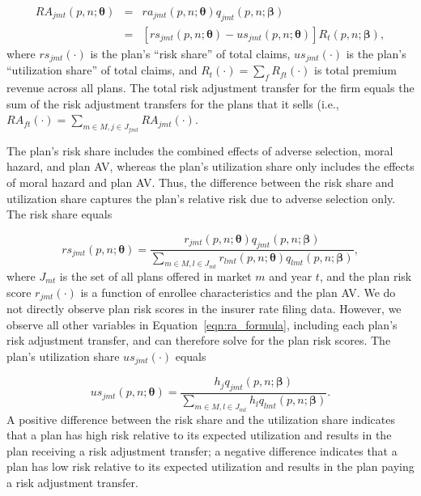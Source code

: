 \documentclass[12pt]{article}
\begin{document}
\vspace{-0.4in}
\begin{eqnarray}
\label{eqn:ra_formula}
	RA_{jmt}(\textit{p},\textit{n};\boldsymbol{\theta}) &=& ra_{jmt}(\textit{p},\textit{n};\boldsymbol{\theta})  q_{jmt}(\textit{p},\textit{n};\boldsymbol{\beta}) \nonumber \\
	&= & \left[rs_{jmt}(\textit{p},\textit{n};\boldsymbol{\theta})  - us_{jmt}(\textit{p},\textit{n};\boldsymbol{\theta})  \right] R_t(\textit{p},\textit{n};\boldsymbol{\beta}),
\end{eqnarray}
where $rs_{jmt}(\cdot)$ is the plan's ``risk share'' of total claims, $us_{jmt}(\cdot)$ is the plan's ``utilization share'' of total claims, and $R_t(\cdot) = \sum_f R_{ft}(\cdot)$ is total premium revenue across all plans. The total risk adjustment transfer for the firm equals the sum of the risk adjustment transfers for the plans that it sells (i.e., $RA_{ft}(\cdot) = \sum_{m \in M, j \in J_{fmt}} RA_{jmt}(\cdot)$.
	
The plan's risk share includes the combined effects of adverse selection, moral hazard, and plan AV, whereas the plan's utilization share only includes the effects of moral hazard and plan AV. Thus, the difference between the risk share and utilization share captures the plan's relative risk due to adverse selection only. The risk share equals

\vspace{-0.1in}
\begin{equation*}
	rs_{jmt}(\textit{p},\textit{n};\boldsymbol{\theta}) = \frac{ r_{jmt}(\textit{p},\textit{n};\boldsymbol{\theta}) q_{jmt}(\textit{p},\textit{n};\boldsymbol{\beta})}{\sum_{m \in M, l \in J_{mt}}  r_{lmt}(\textit{p},\textit{n};\boldsymbol{\theta}) q_{lmt}(\textit{p},\textit{n};\boldsymbol{\beta})},
\end{equation*}
where $J_{mt}$ is the set of all plans offered in market $m$ and year $t$, and the plan risk score $r_{jmt}(\cdot)$ is a function of enrollee characteristics and the plan AV. We do not directly observe plan risk scores in the insurer rate filing data.  However, we observe all other variables in Equation~\eqref{eqn:ra_formula}, including each plan's risk adjustment transfer, and can therefore solve for the plan risk scores. The plan's utilization share $us_{jmt}(\cdot)$ equals

\vspace{-0.1in}
\begin{equation*}
	us_{jmt}(\textit{p},\textit{n};\boldsymbol{\theta}) =  \frac{ h_j q_{jmt}(\textit{p},\textit{n};\boldsymbol{\beta})}{\sum_{m \in M, l \in J_{mt}} h_l q_{lmt}(\textit{p},\textit{n};\boldsymbol{\beta})}.
\end{equation*}
A positive difference between the risk share and the utilization share indicates that a plan has high risk relative to its expected utilization and results in the plan receiving a risk adjustment transfer; a negative difference indicates that a plan has low risk relative to its expected utilization and results in the plan paying a risk adjustment transfer.
\end{document}
